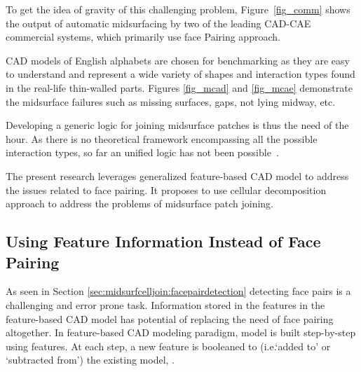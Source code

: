  To get the idea of gravity of this challenging problem,  Figure~\ref{fig_comm} shows the output of automatic midsurfacing by two of the leading CAD-CAE commercial systems, which primarily use face Pairing approach.
 
CAD models of English alphabets are chosen for benchmarking as they are easy to understand and represent a wide variety of shapes and interaction types found in the real-life thin-walled parts. Figures \ref{fig_mcad} and \ref{fig_mcae} demonstrate the midsurface failures such as missing surfaces, gaps, not lying midway, etc.

\def \myfigcommcolumnwidth{0.55}

%
% 
%
%
% 
Developing a generic logic for joining midsurface patches is thus the need of the hour. As there is no theoretical framework encompassing all the possible interaction types, so far an unified logic has not been possible~\cite{Stolt2006}.  

The present research leverages generalized feature-based CAD model to address the issues related to face pairing. It proposes to use cellular decomposition approach to address the problems of midsurface patch joining. 

\subsection{Using Feature Information Instead of Face Pairing}
As seen in Section \ref{sec:midsurfcelljoin:facepairdetection} detecting face pairs is a challenging and error prone task. Information stored in the features in the feature-based CAD model has potential of replacing the need of face pairing altogether. In feature-based CAD modeling paradigm, model is built step-by-step using features. At each step, a new feature is booleaned to (i.e.`added to' or `subtracted from') the existing model, .

